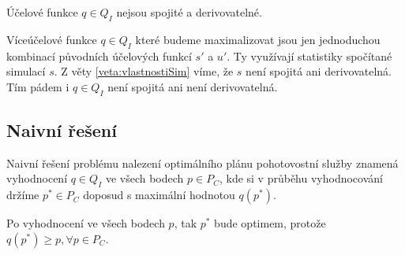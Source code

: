 \begin{veta}\label{veta:nespANedevQ}
  Účelové funkce $q \in Q_I$ nejsou spojité a derivovatelné.
\end{veta}

\begin{dukaz}
  Víceúčelové funkce $q \in Q_I$ které budeme maximalizovat jsou jen jednoduchou kombinací původních účelových funkcí $s'$ a $u'$.
  Ty využívají statistiky spočítané simulací $s$.
  Z věty \ref{veta:vlastnostiSim} víme, že $s$ není spojitá ani derivovatelná.
  Tím pádem i $q \in Q_I$ není spojitá ani není derivovatelná.
\end{dukaz}

\subsection{Naivní řešení}\label{kap:naivniRes}

\begin{definice}\label{df:naivniRes}
  Naivní řešení problému nalezení optimálního plánu pohotovostní služby znamená vyhodnocení $q \in Q_I$ ve všech bodech $p \in P_C$,
  kde si v průběhu vyhodnocování držíme $p^* \in P_C$ doposud s maximální hodnotou $q(p^*)$.

  Po vyhodnocení ve všech bodech $p$, tak $p^*$ bude optimem, protože $q(p^*) \geq p, \forall p \in P_C$.
\end{definice}

